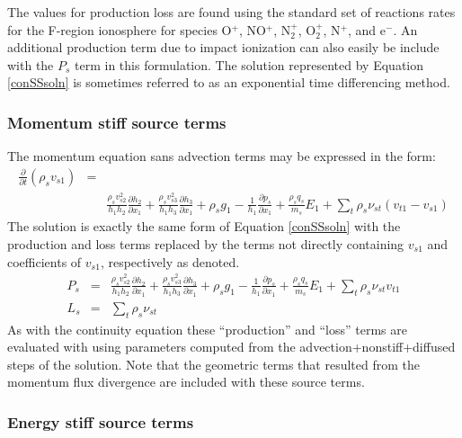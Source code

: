 \documentclass[11pt,letterpaper]{article}
\begin{document}
The values for production loss are found using the standard set of reactions rates for the F-region ionosphere for species O$^+$, NO$^+$, N$_2^+$, O$_2^+$, N$^+$, and e$^-$.  An additional production term due to impact ionization can also easily be include with the $P_s$ term in this formulation.  The solution represented by Equation \ref{conSSsoln} is sometimes referred to as an exponential time differencing method.  

\subsubsection{Momentum stiff source terms}

The momentum equation sans advection terms may be expressed in the form:
\begin{eqnarray}
\frac{\partial}{\partial t} \left( \rho_s v_{s1} \right) &=& \nonumber \\
~ &~& \frac{\rho_s v_{s2}^2}{h_1 h_2} \frac{\partial h_2}{\partial x_1} + \frac{\rho_s v_{s3}^2}{h_1 h_3} \frac{\partial h_3}{\partial x_1}  + \rho_s g_1 - \frac{1}{h_1} \frac{\partial p_s}{\partial x_1} + \frac{\rho_s q_s}{m_s} E_1 + \sum_t \rho_s \nu_{st} \left( v_{t1} - v_{s1} \right)
\end{eqnarray}
The solution is exactly the same form of Equation \ref{conSSsoln} with the production and loss terms replaced by the terms not directly containing $v_{s1}$ and coefficients of $v_{s1}$, respectively as denoted.  
\begin{eqnarray}
P_s &=& \frac{\rho_s v_{s2}^2}{h_1 h_2} \frac{\partial h_2}{\partial x_1} + \frac{\rho_s v_{s3}^2}{h_1 h_3} \frac{\partial h_3}{\partial x_1}  + \rho_s g_1 - \frac{1}{h_1} \frac{\partial p_s}{\partial x_1} + \frac{\rho_s q_s}{m_s} E_1 + \sum_t \rho_s \nu_{st} v_{t1} \nonumber \\
L_s &=& \sum_t \rho_s \nu_{st}
\end{eqnarray}
As with the continuity equation these ``production'' and ``loss'' terms are evaluated with using parameters computed from the advection+nonstiff+diffused steps of the solution.  Note that the geometric terms that resulted from the momentum flux divergence are included with these source terms.  %

\subsubsection{Energy stiff source terms}
\end{document}
